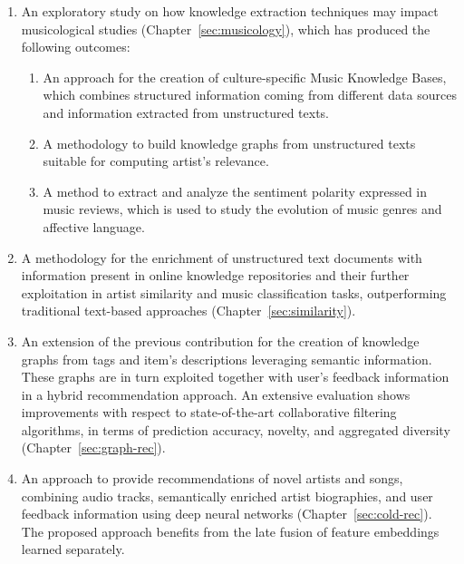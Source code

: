 \begin{enumerate}
\item 
An exploratory study on how knowledge extraction techniques may impact musicological studies (Chapter~\ref{sec:musicology}), which has produced the following outcomes:
\begin{enumerate}
\item 
An approach for the creation of culture-specific Music Knowledge Bases, which combines structured information coming from different data sources and information extracted from unstructured texts. 
\item
A methodology to build knowledge graphs from unstructured texts suitable for computing artist's relevance.
\item 
A method to extract and analyze the sentiment polarity expressed in music reviews, which is used to study the evolution of music genres and affective language.
\end{enumerate}

\item 
A methodology for the enrichment of unstructured text documents with information present in online knowledge repositories and their further exploitation in artist similarity and music classification tasks, outperforming traditional text-based approaches (Chapter~\ref{sec:similarity}).

\item
An extension of the previous contribution for the creation of knowledge graphs from tags and item's descriptions leveraging semantic information. These graphs are in turn exploited together with user's feedback information in a hybrid recommendation approach. An extensive evaluation shows improvements with respect to state-of-the-art collaborative filtering algorithms, in terms of prediction accuracy, novelty, and aggregated diversity (Chapter~\ref{sec:graph-rec}).%

\item 
An approach to provide recommendations of novel artists and songs, combining audio tracks, semantically enriched artist biographies, and user feedback information using deep neural networks (Chapter~\ref{sec:cold-rec}). The proposed approach benefits from the late fusion of feature embeddings learned separately. %


\end{enumerate}
